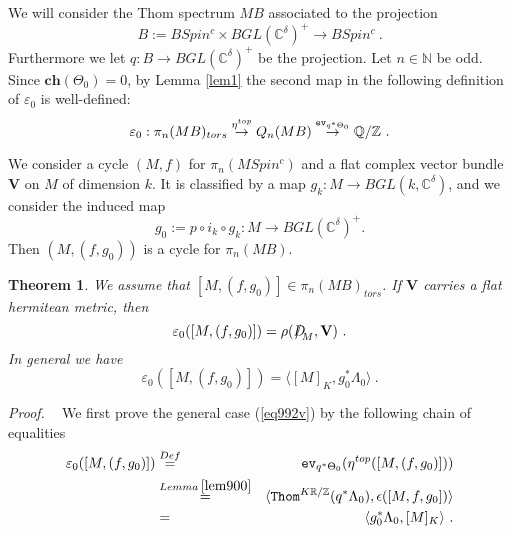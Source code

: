 \documentclass[12pt]{article}
\newtheorem{theorem}{Theorem}[section]
\newcommand{\Thom}{{\tt Thom}}
\newcommand{\ev}{{\tt ev}}
\newcommand{\proof}{{\it Proof.$\:\:\:\:$}}
\newcommand{\nat}{{\mathbb{N}}}
\newcommand{\Z}{{\mathbb{Z}}}
\newcommand{\Q}{{\mathbb{Q}}}
\newcommand{\R}{{\mathbb{R}}}
\newcommand{\C}{{\mathbb{C}}}
\newcommand{\ch}{{\mathbf{ch}}}
\newcommand{\bV}{{\mathbf{V}}}
\newcommand{\Dirac}{{D\hspace{-0.27cm}/}}
\begin{document}
 






We will consider the Thom spectrum $MB$ associated to the projection $$B:=BSpin^{c}\times BGL(\C^{\delta})^{+}\to BSpin^{c}\ .$$  Furthermore we let
$q:B\to BGL(\C^{\delta})^{+}$ be the projection. 
Let $n\in \nat$ be odd.
Since $\ch(\Theta_{0})=0$, by  Lemma 
 \ref{lem1} 
the second map in the following definition of $\varepsilon_{0}$ is well-defined:
 $$\varepsilon_{0}:\pi_{n}(MB)_{tors}\stackrel{\eta^{top}}{\to} Q_{n}(MB)\stackrel{\ev_{q^{*}\Theta_{0}}}{\to} \Q/\Z\ .$$


We consider a cycle $(M,f)$ for $\pi_{n}(MSpin^{c})$ and a flat complex vector bundle $\bV$ on $M$ of dimension $k$. It is classified by a map $g_{k}:M\to BGL(k,\C^{\delta})$, and we consider the induced map $$g_{0}:=p\circ i_{k} \circ g_{k}:M\to BGL(\C^{\delta})^{+} .$$  Then
$(M,(f,g_{0}))$ is a cycle for $\pi_{n}(MB)$.

\begin{theorem}\label{them1000}   We assume that 
$[M,(f,g_{0})]\in \pi_{n}(MB)_{tors}$. If $\bV$ carries a flat hermitean metric, then
\begin{equation}\label{eq991v}
\varepsilon_{0}([M,(f,g_{0})])=\rho(\Dirac_{M},\bV) \ .\end{equation}
In general we have  
\begin{equation}\label{eq992v}
\varepsilon_{0}([M,(f,g_{0})])=\langle[M]_{K}, g_{0}^{*}\Lambda_{0}\rangle\ . \end{equation}
 \end{theorem}
\proof 
We first prove the general case (\ref{eq992v}) by the following chain of equalities
\begin{eqnarray*}\varepsilon_{0}([M,(f,g_{0})])&\stackrel{Def}{=}&\ev_{q^{*}\Theta_{0}}(\eta^{top}([M,(f,g_{0})]))\\&\stackrel{Lemma \:\ref{lem900}}{=}&\langle \Thom^{K\R/\Z}(q^{*}\Lambda_{0}), \epsilon([M,f,g_{0}])\rangle\\&=&\langle g_{0}^{*}\Lambda_{0}, [M]_{K}\rangle\ .\end{eqnarray*}
\end{document}
